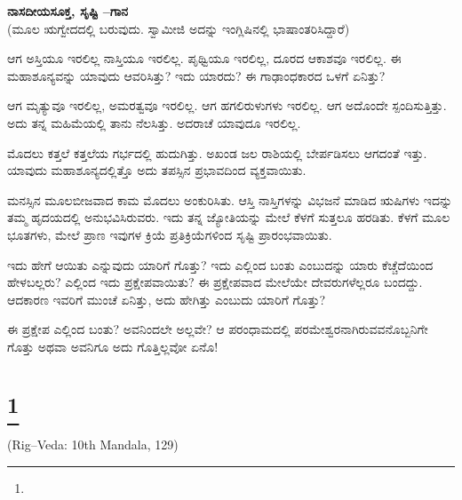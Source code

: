 \selectkan

\begin{center}
\textbf{ನಾಸದೀಯಸೂಕ್ತ, ಸೃಷ್ಟಿ –ಗಾನ}\\(ಮೂಲ ಋಗ್ವೇದದಲ್ಲಿ ಬರುವುದು. ಸ್ವಾಮೀಜಿ ಅದನ್ನು ಇಂಗ್ಲಿಷಿನಲ್ಲಿ ಭಾಷಾಂತರಿಸಿದ್ದಾರೆ)
\end{center}

ಆಗ ಅಸ್ತಿಯೂ ಇರಲಿಲ್ಲ ನಾಸ್ತಿಯೂ ಇರಲಿಲ್ಲ. ಪೃಥ್ವಿಯೂ ಇರಲಿಲ್ಲ, ದೂರದ ಆಕಾಶವೂ ಇರಲಿಲ್ಲ. ಈ ಮಹಾಶೂನ್ಯವನ್ನು ಯಾವುದು ಆವರಿಸಿತ್ತು? ಇದು ಯಾರದು? ಈ ಗಾಢಾಂಧಕಾರದ ಒಳಗೆ ಏನಿತ್ತು?

ಆಗ ಮೃತ್ಯುವೂ ಇರಲಿಲ್ಲ, ಅಮರತ್ವವೂ ಇರಲಿಲ್ಲ. ಆಗ ಹಗಲಿರುಳುಗಳು ಇರಲಿಲ್ಲ. ಆಗ ಅದೊಂದೇ ಸ್ಪಂದಿಸುತ್ತಿತ್ತು. ಅದು ತನ್ನ ಮಹಿಮೆಯಲ್ಲಿ ತಾನು ನೆಲಸಿತ್ತು. ಅದರಾಚೆ ಯಾವುದೂ ಇರಲಿಲ್ಲ.

ಮೊದಲು ಕತ್ತಲೆ ಕತ್ತಲೆಯ ಗರ್ಭದಲ್ಲಿ ಹುದುಗಿತ್ತು. ಅಖಂಡ ಜಲ ರಾಶಿಯಲ್ಲಿ ಬೇರ್ಪಡಿಸಲು ಆಗದಂತೆ ಇತ್ತು. ಯಾವುದು ಮಹಾಶೂನ್ಯದಲ್ಲಿತ್ತೊ ಅದು ತಪಸ್ಸಿನ ಪ್ರಭಾವದಿಂದ ವ್ಯಕ್ತವಾಯಿತು.

ಮನಸ್ಸಿನ ಮೂಲಬೀಜವಾದ ಕಾಮ ಮೊದಲು ಅಂಕುರಿಸಿತು. ಆಸ್ತಿ ನಾಸ್ತಿಗಳನ್ನು ವಿಭಜನೆ ಮಾಡಿದ ಋಷಿಗಳು ಇದನ್ನು ತಮ್ಮ ಹೃದಯದಲ್ಲಿ ಅನುಭವಿಸಿರುವರು. ಇದು ತನ್ನ ಜ್ಯೋತಿಯನ್ನು ಮೇಲೆ ಕೆಳಗೆ ಸುತ್ತಲೂ ಹರಡಿತು. ಕೆಳಗೆ ಮೂಲ ಭೂತಗಳು, ಮೇಲೆ ಪ್ರಾಣ ಇವುಗಳ ಕ್ರಿಯೆ ಪ್ರತಿಕ್ರಿಯೆಗಳಿಂದ ಸೃಷ್ಟಿ ಪ್ರಾರಂಭವಾಯಿತು.

ಇದು ಹೇಗೆ ಆಯಿತು ಎನ್ನುವುದು ಯಾರಿಗೆ ಗೊತ್ತು? ಇದು ಎಲ್ಲಿಂದ ಬಂತು ಎಂಬುದನ್ನು ಯಾರು ಕೆಚ್ಚೆದೆಯಿಂದ ಹೇಳಬಲ್ಲರು? ಎಲ್ಲಿಂದ ಇದು ಪ್ರಕ್ಷೇಪವಾಯಿತು? ಈ ಪ್ರಕ್ಷೇಪವಾದ ಮೇಲೆಯೇ ದೇವರುಗಳೆಲ್ಲರೂ ಬಂದದ್ದು. ಆದಕಾರಣ ಇವರಿಗೆ ಮುಂಚೆ ಏನಿತ್ತು, ಅದು ಹೇಗಿತ್ತು ಎಂಬುದು ಯಾರಿಗೆ ಗೊತ್ತು?

ಈ ಪ್ರಕ್ಷೇಪ ಎಲ್ಲಿಂದ ಬಂತು? ಅವನಿಂದಲೇ ಅಲ್ಲವೇ? ಆ ಪರಂಧಾಮದಲ್ಲಿ ಪರಮೇಶ್ವರನಾಗಿರುವವನೊಬ್ಬನಿಗೇ ಗೊತ್ತು ಅಥವಾ ಅವನಿಗೂ ಅದು ಗೊತ್ತಿಲ್ಲವೋ ಏನೊ!

\selecteng

\chapter[THY LOVE I FEAR]{\protect\footnote{}}

\begin{center}
(Rig–Veda: 10th Mandala, 129)
\end{center}

\begin{myquote}
\end{myquote}

\begin{myquote}
\end{myquote}

